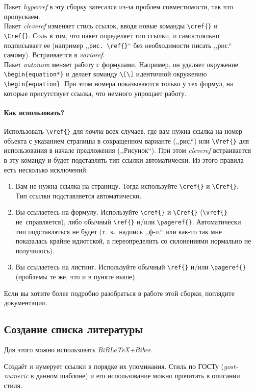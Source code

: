 Пакет \emph{hyperref} в эту сборку затесался из-за проблем совместимости, так что пропускаем.\cite{hyperref} ~\\

Пакет \emph{cleveref} изменяет стиль ссылок, вводя новые команды \verb|\сref{}| и \\ \verb|\Cref{}|.\cite{cleveref} Соль в том, что пакет определяет тип ссылки, и самостояльно подписывает ее (например ,,\verb|рис. \ref{}|`` без необходимости писать ,,рис.`` самому). Встраивается в \emph{varioref}. ~\\

Пакет \emph{autonum} меняет работу с формулами.\cite{autonum} Например, он удаляет окружение \verb|\begin{equation*}| и делает команду \verb|\[\]| идентичной окружению \\ \verb|\begin{equation}|. При этом номера показываются только у тех формул, на которые присутствует ссылка, что немного упрощает работу. ~\\

\paragraph{Как использовать?}

Использовать \verb|\vref{}| для \emph{почти} всех случаев, где вам нужна ссылка на номер объекта с указанием страницы в сокращенном варианте (,,рис.``) или \verb|\Vref{}| для использования в начале предложения (,,Рисунок``). При этом \emph{cleveref} встраивается в эту команду и будет подставлять тип ссылки автоматически. Из этого правила есть несколько исключений:
\begin{enumerate}
	\item Вам не нужна ссылка на страницу. Тогда используйте \verb|\сref{}| и \verb|\Cref{}|. Тип ссылки подставляется автоматически.
	\item Вы ссылаетесь на формулу. Используйте \verb|\сref{}| и \verb|\Cref{}| (\verb|\vref{}| не~справляется), либо обычный \verb|\ref{}| и/или \verb|\pageref{}|. Автоматически тип подставляться не будет (т.~к.~надпись ,,ф-л.`` или как-то так мне показалась крайне идиотской, а переопределить со склонениями нормально не получилось). 
	\item Вы ссылаетесь на листинг. Используйте обычный \verb|\ref{}| и/или \verb|\pageref{}| (проблемы те же, что и в пункте выше)
\end{enumerate}

Если вы хотите более подробно разобраться в работе этой сборки, поглядите документации.

\subsection{Создание списка литературы}

Для этого можно использовать \emph{BiBLaTeX+Biber}.\cite{biblatex}

Создаёт и нумерует ссылки в порядке их упоминания.\cite{modelcheck} Стиль по ГОСТу (\emph{gost-numeric} в данном шаблоне) и его использование можно прочитать в описании стиля.\cite{gost}